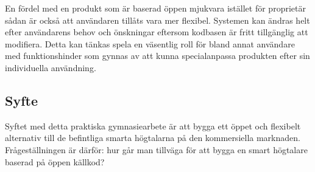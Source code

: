 En fördel med en produkt som är baserad öppen mjukvara istället för proprietär sådan är också att användaren tillåts vara mer flexibel. Systemen kan ändras helt efter användarens behov och önskningar eftersom kodbasen är fritt tillgänglig att modifiera. Detta kan tänkas spela en väsentlig roll för bland annat användare med funktionshinder som gynnas av att kunna specialanpassa produkten efter sin individuella användning.

\subsection{Syfte}
Syftet med detta praktiska gymnasiearbete är att bygga ett öppet och flexibelt alternativ till de befintliga smarta högtalarna på den kommersiella marknaden. Frågeställningen är därför: hur går man tillväga för att bygga en smart högtalare baserad på öppen källkod?

